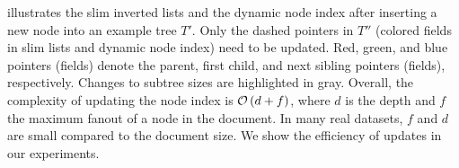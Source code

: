  illustrates the slim inverted lists and the dynamic node index after inserting a new node into an example tree $T'$. Only the dashed pointers in $T''$ (colored fields in slim lists and dynamic node index) need to be updated. Red, green, and blue pointers (fields) denote the parent, first child, and next sibling pointers (fields), respectively. Changes to subtree sizes are highlighted in gray. Overall, the complexity of updating the node index is $\mathcal{O} \left( d + f \right)$, where $d$ is the depth and $f$ the maximum fanout of a node in the document. In many real datasets, $f$ and $d$ are small compared to the document size. We show the efficiency of updates in our experiments.
